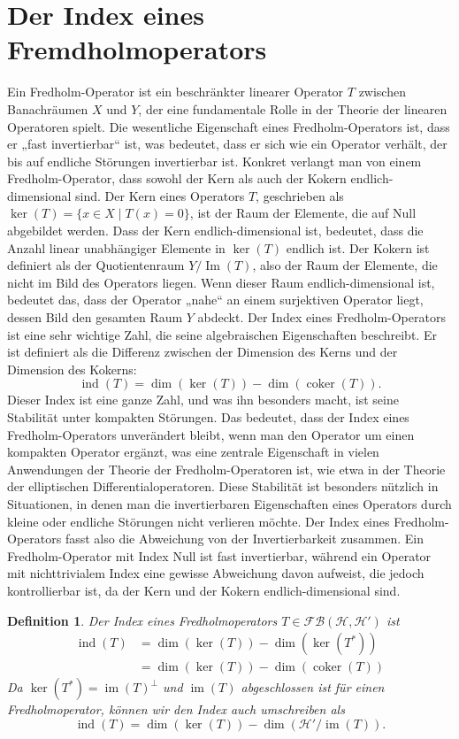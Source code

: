 \documentclass[11pt, hidelinks]{article}
\newcommand{\h}{\mathcal{H}}
\newcommand{\ind}{\operatorname{ind}}
\newcommand{\im}{\operatorname{im}}
\newcommand{\coker}{\operatorname{coker}}
\numberwithin{conj}{section}
\newtheorem{definition}[conj]{Definition}
\begin{document}
\section{Der Index eines Fremdholmoperators}
Ein Fredholm-Operator ist ein beschränkter linearer Operator \( T \) zwischen Banachräumen \( X \) und \( Y \), der eine fundamentale Rolle in der Theorie der linearen Operatoren spielt. Die wesentliche Eigenschaft eines Fredholm-Operators ist, dass er „fast invertierbar“ ist, was bedeutet, dass er sich wie ein Operator verhält, der bis auf endliche Störungen invertierbar ist. Konkret verlangt man von einem Fredholm-Operator, dass sowohl der Kern als auch der Kokern endlich-dimensional sind. Der Kern eines Operators \( T \), geschrieben als \( \ker(T) = \{ x \in X \mid T(x) = 0 \} \), ist der Raum der Elemente, die auf Null abgebildet werden. Dass der Kern endlich-dimensional ist, bedeutet, dass die Anzahl linear unabhängiger Elemente in \( \ker(T) \) endlich ist. Der Kokern ist definiert als der Quotientenraum \( Y / \operatorname{Im}(T) \), also der Raum der Elemente, die nicht im Bild des Operators liegen. Wenn dieser Raum endlich-dimensional ist, bedeutet das, dass der Operator „nahe“ an einem surjektiven Operator liegt, dessen Bild den gesamten Raum \( Y \) abdeckt. Der Index eines Fredholm-Operators ist eine sehr wichtige Zahl, die seine algebraischen Eigenschaften beschreibt. Er ist definiert als die Differenz zwischen der Dimension des Kerns und der Dimension des Kokerns:
\[
\operatorname{ind}(T) = \dim(\ker(T)) - \dim(\operatorname{coker}(T)).
\]
Dieser Index ist eine ganze Zahl, und was ihn besonders macht, ist seine Stabilität unter kompakten Störungen. Das bedeutet, dass der Index eines Fredholm-Operators unverändert bleibt, wenn man den Operator um einen kompakten Operator ergänzt, was eine zentrale Eigenschaft in vielen Anwendungen der Theorie der Fredholm-Operatoren ist, wie etwa in der Theorie der elliptischen Differentialoperatoren. Diese Stabilität ist besonders nützlich in Situationen, in denen man die invertierbaren Eigenschaften eines Operators durch kleine oder endliche Störungen nicht verlieren möchte. Der Index eines Fredholm-Operators fasst also die Abweichung von der Invertierbarkeit zusammen. Ein Fredholm-Operator mit Index Null ist fast invertierbar, während ein Operator mit nichttrivialem Index eine gewisse Abweichung davon aufweist, die jedoch kontrollierbar ist, da der Kern und der Kokern endlich-dimensional sind.

\begin{definition}
    Der Index eines Fredholmoperators $T \in \mathcal{FB}(\h,\h')$ ist
    \begin{align}
        \ind(T) &= \dim(\ker(T)) - \dim(\ker(T^\ast)) \nonumber\\
                &= \dim(\ker(T)) - \dim(\coker(T))
    \end{align}
    Da $\ker(T^\ast) = \im(T)^\perp$ und $\im(T)$ abgeschlossen ist für einen Fredholmoperator, können wir den Index auch umschreiben als
    \begin{equation}
        \ind(T) = \dim(\ker(T)) - \dim(\h'/\im(T)).
    \end{equation}
\end{definition}
\end{document}
